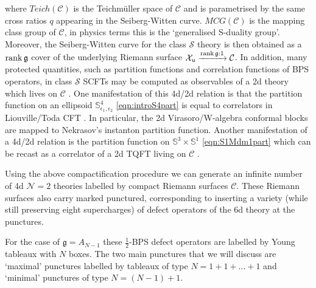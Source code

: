 \documentclass[main.tex]{subfiles}
\begin{document}
where $Teich(\mathcal{C})$ is the Teichm\"uller space of $\mathcal{C}$ and is parametrised by the same cross ratios $q$ appearing in the Seiberg-Witten curve.  $MCG(\mathcal{C})$ is the mapping class group of $\mathcal{C}$, in physics terms this is the `generalised S-duality group'.  Moreover, the Seiberg-Witten curve for the class $\mathcal{S}$ theory is then obtained as a $\operatorname{rank} \mathfrak{g}$ cover of the underlying Riemann surface $\mathcal{X}_u\xrightarrow[]{\operatorname{rank} \mathfrak{g}:1}\mathcal{C}$.
In addition, many protected quantities, such as partition functions and correlation functions of BPS operators, in class $\mathcal{S}$ SCFTs may be computed as observables of a 2d theory which lives on $\mathcal{C}$ \cite{Alday:2009aq,Alday:2009fs}.  One manifestation of this 4d/2d relation is that the partition function on an ellipsoid $\mathbb{S}^4_{\epsilon_1,\epsilon_2}$ \eqref{eqn:introS4part} is equal to correlators in Liouville/Toda CFT \cite{Alday:2009aq,Wyllard:2009hg}.  In particular, the 2d Virasoro/W-algebra conformal blocks are mapped to Nekrasov's instanton partition function.  Another manifestation of a 4d/2d relation is the partition function on $\mathbb{S}^3\times \mathbb{S}^1$ \eqref{eqn:S1Mdm1part} which can be recast as a correlator of a 2d TQFT living on $\mathcal{C}$ \cite{Gadde:2009kb,Gadde:2011ik}.

Using the above compactification procedure we can generate an infinite number of 4d $\mathcal{N}=2$ theories labelled by compact Riemann surfaces $\mathcal{C}$.  These Riemann surfaces also carry marked punctured, corresponding to inserting a variety (while still preserving eight supercharges) of defect operators of the 6d theory at the punctures.

For the case of $\mathfrak{g}=A_{N-1}$ these $\frac{1}{2}$-BPS defect operators are labelled by Young tableaux \cite{Gaiotto:2009hg,Gaiotto:2009we} with $N$ boxes.  The two main punctures that we will discuss are `maximal' punctures labelled by tableaux of type $N=1+1+\dots+1$ and `minimal' punctures of type $N=(N-1)+1$.
\end{document}
